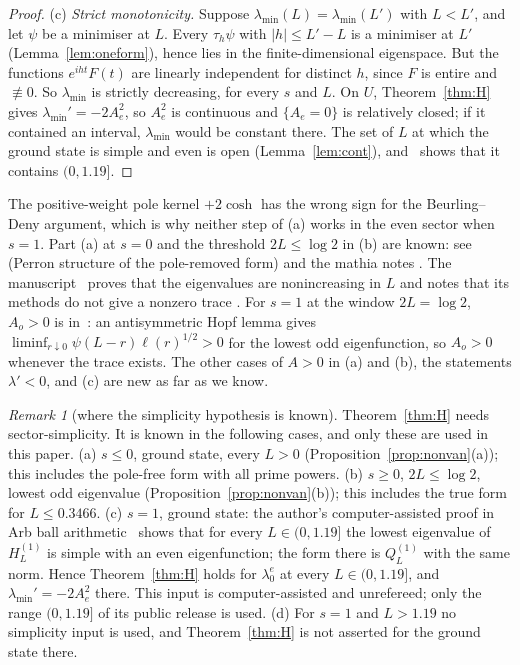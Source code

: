 \documentclass[11pt]{amsart}
\theoremstyle{definition}
\theoremstyle{remark}
\newtheorem{remark}[theorem]{Remark}
\numberwithin{equation}{section}
\begin{document}
\begin{proof}
(c) \emph{Strict monotonicity.} Suppose $\lambda_{\min}(L)=\lambda_{\min}(L')$ with $L<L'$, and let $\psi$ be a minimiser at $L$. Every $\tau_h\psi$ with $|h|\le L'-L$ is a minimiser at $L'$ (Lemma~\ref{lem:oneform}), hence lies in the finite-dimensional eigenspace. But the functions $e^{iht}F(t)$ are linearly independent for distinct $h$, since $F$ is entire and $\not\equiv0$. So $\lambda_{\min}$ is strictly decreasing, for every $s$ and $L$. On $U$, Theorem~\ref{thm:H} gives $\lambda_{\min}'=-2A_e^2$, so $A_e^2$ is continuous and $\{A_e=0\}$ is relatively closed; if it contained an interval, $\lambda_{\min}$ would be constant there. The set of $L$ at which the ground state is simple and even is open (Lemma~\ref{lem:cont}), and~\cite{GS} shows that it contains $(0,1.19]$.
\end{proof}

The positive-weight pole kernel $+2\cosh$ has the wrong sign for the Beurling--Deny argument, which is why neither step of (a) works in the even sector when $s=1$. Part (a) at $s=0$ and the threshold $2L\le\log2$ in (b) are known: see~\cite{And1} (Perron structure of the pole-removed form) and the mathia notes \cite{PL294,PL324,PL335}. The manuscript~\cite{BT26} proves that the eigenvalues are nonincreasing in $L$ and notes that its methods do not give a nonzero trace \cite[\S6]{BT26}. For $s=1$ at the window $2L=\log2$, $A_o>0$ is in~\cite{PL335}: an antisymmetric Hopf lemma gives $\liminf_{r\downarrow0}\psi(L-r)\ell(r)^{1/2}>0$ for the lowest odd eigenfunction, so $A_o>0$ whenever the trace exists. The other cases of $A>0$ in (a) and (b), the statements $\lambda'<0$, and (c) are new as far as we know.

\begin{remark}[where the simplicity hypothesis is known]\label{rem:simple}
Theorem~\ref{thm:H} needs sector-simplicity. It is known in the following cases, and only these are used in this paper.
(a) $s\le0$, ground state, every $L>0$ (Proposition~\ref{prop:nonvan}(a)); this includes the pole-free form with all prime powers.
(b) $s\ge0$, $2L\le\log2$, lowest odd eigenvalue (Proposition~\ref{prop:nonvan}(b)); this includes the true form for $L\le0.3466$.
(c) $s=1$, ground state: the author's computer-assisted proof in Arb ball arithmetic~\cite{GS} shows that for every $L\in(0,1.19]$ the lowest eigenvalue of $H^{(1)}_L$ is simple with an even eigenfunction; the form there is $Q^{(1)}_L$ with the same norm. Hence Theorem~\ref{thm:H} holds for $\lambda^e_0$ at every $L\in(0,1.19]$, and $\lambda_{\min}'=-2A_e^2$ there. This input is computer-assisted and unrefereed; only the range $(0,1.19]$ of its public release is used.
(d) For $s=1$ and $L>1.19$ no simplicity input is used, and Theorem~\ref{thm:H} is not asserted for the ground state there.
\end{remark}
\end{document}
